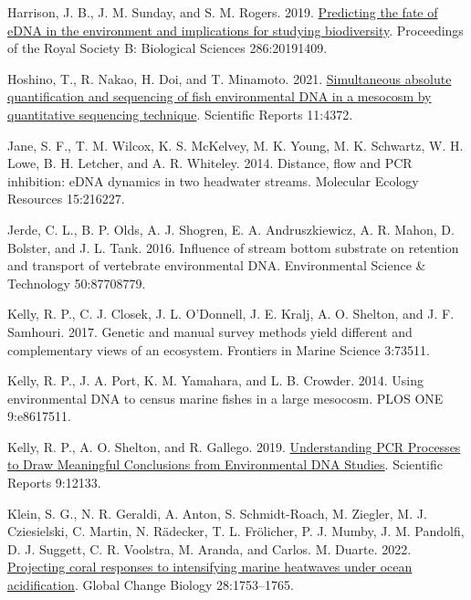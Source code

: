 \documentclass[
]{article}
\newlength{\cslhangindent}
\newlength{\cslentryspacingunit} %
\newenvironment{CSLReferences}[2] %
 {%
  \setlength{\parindent}{0pt}
  \ifodd #1
  \let\oldpar\par
  \def\par{\hangindent=\cslhangindent\oldpar}
  \fi
  \setlength{\parskip}{#2\cslentryspacingunit}
 }%
 {}
\begin{document}
\begin{CSLReferences}{1}{0}
\leavevmode{}%
Harrison, J. B., J. M. Sunday, and S. M. Rogers. 2019.
\href{https://doi.org/10.1098/rspb.2019.1409}{Predicting the fate of
eDNA in the environment and implications for studying biodiversity}.
Proceedings of the Royal Society B: Biological Sciences 286:20191409.

\leavevmode{}%
Hoshino, T., R. Nakao, H. Doi, and T. Minamoto. 2021.
\href{https://doi.org/10.1038/s41598-021-83318-6}{Simultaneous absolute
quantification and sequencing of fish environmental DNA in a mesocosm by
quantitative sequencing technique}. Scientific Reports 11:4372.

\leavevmode{}%
Jane, S. F., T. M. Wilcox, K. S. McKelvey, M. K. Young, M. K. Schwartz,
W. H. Lowe, B. H. Letcher, and A. R. Whiteley. 2014. Distance, flow and
PCR inhibition: eDNA dynamics in two headwater streams. Molecular
Ecology Resources 15:216227.

\leavevmode{}%
Jerde, C. L., B. P. Olds, A. J. Shogren, E. A. Andruszkiewicz, A. R.
Mahon, D. Bolster, and J. L. Tank. 2016. Influence of stream bottom
substrate on retention and transport of vertebrate environmental DNA.
Environmental Science \& Technology 50:87708779.

\leavevmode{}%
Kelly, R. P., C. J. Closek, J. L. O'Donnell, J. E. Kralj, A. O. Shelton,
and J. F. Samhouri. 2017. Genetic and manual survey methods yield
different and complementary views of an ecosystem. Frontiers in Marine
Science 3:73511.

\leavevmode{}%
Kelly, R. P., J. A. Port, K. M. Yamahara, and L. B. Crowder. 2014. Using
environmental DNA to census marine fishes in a large mesocosm. PLOS ONE
9:e8617511.

\leavevmode{}%
Kelly, R. P., A. O. Shelton, and R. Gallego. 2019.
\href{https://doi.org/10.1038/s41598-019-48546-x}{Understanding PCR
Processes to Draw Meaningful Conclusions from Environmental DNA
Studies}. Scientific Reports 9:12133.

\leavevmode{}%
Klein, S. G., N. R. Geraldi, A. Anton, S. Schmidt-Roach, M. Ziegler, M.
J. Cziesielski, C. Martin, N. Rädecker, T. L. Frölicher, P. J. Mumby, J.
M. Pandolfi, D. J. Suggett, C. R. Voolstra, M. Aranda, and Carlos. M.
Duarte. 2022. \href{https://doi.org/10.1111/gcb.15818}{Projecting coral
responses to intensifying marine heatwaves under ocean acidification}.
Global Change Biology 28:1753--1765.


\end{CSLReferences}
\end{document}
